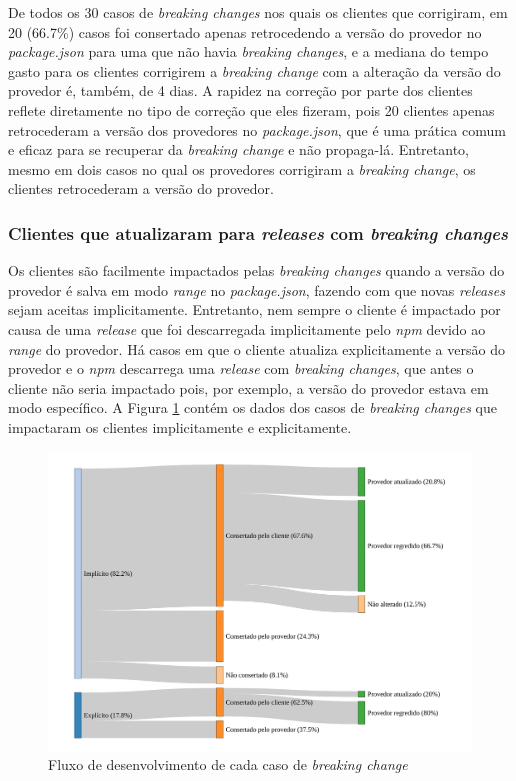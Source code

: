 De todos os 30 casos de \textit{breaking changes} nos quais os clientes que corrigiram, em 20 (66.7\%) casos foi consertado apenas retrocedendo a versão do provedor no \textit{package.json} para uma que não havia \textit{breaking changes}, e a mediana do tempo gasto para os clientes corrigirem a \textit{breaking change} com a alteração da versão do provedor é, também, de 4 dias. A rapidez na correção por parte dos clientes reflete diretamente no tipo de correção que eles fizeram, pois 20 clientes apenas retrocederam a versão dos provedores no \textit{package.json}, que é uma prática comum e eficaz para se recuperar da \textit{breaking change} e não propaga-lá. Entretanto, mesmo em dois casos no qual os provedores corrigiram a \textit{breaking change}, os clientes retrocederam a versão do provedor.

\subsubsection{Clientes que atualizaram para \textit{releases} com \textit{breaking changes}}

Os clientes são facilmente impactados pelas \textit{breaking changes} quando a versão do provedor é salva em modo \textit{range} no \textit{package.json}, fazendo com que novas \textit{releases} sejam aceitas implicitamente. Entretanto, nem sempre o cliente é impactado por causa de uma \textit{release} que foi descarregada implicitamente pelo \textit{npm} devido ao \textit{range} do provedor. Há casos em que o cliente atualiza explicitamente a versão do provedor e o \textit{npm} descarrega uma \textit{release} com \textit{breaking changes}, que antes o cliente não seria impactado pois, por exemplo, a versão do provedor estava em modo específico. A Figura \ref{fig:recovery_clients} contém os dados dos casos de \textit{breaking changes} que impactaram os clientes implicitamente e explicitamente.

\begin{figure}[!h]
	\centering
	\includegraphics[scale=0.45]{figuras/recovery_clients.pdf}
	\caption{Fluxo de desenvolvimento de cada caso de \textit{breaking change}}
	\label{fig:recovery_clients}
\end{figure}{}

